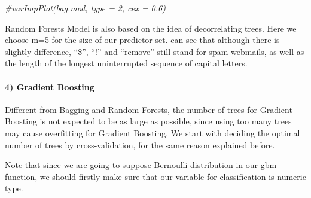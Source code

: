 \documentclass[
  11pt,
]{article}
\newenvironment{Shaded}{\begin{snugshade}}{\end{snugshade}}
\newcommand{\CommentTok}[1]{\textcolor[rgb]{0.56,0.35,0.01}{\textit{#1}}}
\newcommand{\DecValTok}[1]{\textcolor[rgb]{0.00,0.00,0.81}{#1}}
\newcommand{\FunctionTok}[1]{\textcolor[rgb]{0.00,0.00,0.00}{#1}}
\newcommand{\NormalTok}[1]{#1}
\newcommand{\OtherTok}[1]{\textcolor[rgb]{0.56,0.35,0.01}{#1}}
\newcommand{\SpecialCharTok}[1]{\textcolor[rgb]{0.00,0.00,0.00}{#1}}
\newcommand{\StringTok}[1]{\textcolor[rgb]{0.31,0.60,0.02}{#1}}
\begin{document}
\begin{Shaded}
\begin{Highlighting}[]
\CommentTok{\#varImpPlot(bag.mod, type = 2, cex = 0.6)}
\end{Highlighting}
\end{Shaded}

Random Forests Model is also based on the idea of decorrelating trees. Here we choose m=5 for the size of our predictor set. can see that although there is slightly difference, ``\$'', ``!'' and ``remove'' still stand for spam webmails, as well as the length of the longest uninterrupted sequence of capital letters.

\hypertarget{gradient-boosting}{%
\paragraph{4) Gradient Boosting}\label{gradient-boosting}}

Different from Bagging and Random Forests, the number of trees for Gradient Boosting is not expected to be as large as possible, since using too many trees may cause overfitting for Gradient Boosting. We start with deciding the optimal number of trees by cross-validation, for the same reason explained before.

Note that since we are going to suppose Bernoulli distribution in our gbm function, we should firstly make sure that our variable for classification is numeric type.

\begin{Shaded}
\end{Shaded}
\end{document}
